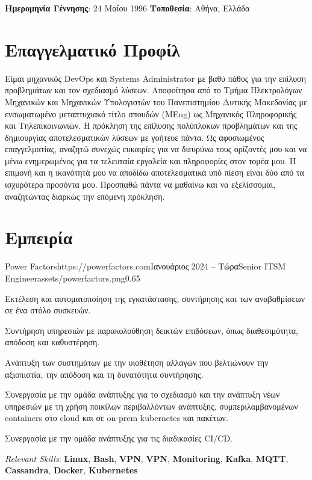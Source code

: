 \documentclass{mycv}
\begin{document}
	\pagestyle{empty}
	\begin{center}
		\textbf{Ημερομηνία Γέννησης}: 24 Μαΐου 1996 {\Large\textperiodcentered} \textbf{Τοποθεσία}: Αθήνα, Ελλάδα
	\end{center}

	\section{Επαγγελματικό Προφίλ}
	Είμαι μηχανικός DevOps και Systems Administrator με βαθύ πάθος για την επίλυση προβλημάτων και τον σχεδιασμό λύσεων. Αποφοίτησα από το Τμήμα Ηλεκτρολόγων Μηχανικών και Μηχανικών Υπολογιστών του Πανεπιστημίου Δυτικής Μακεδονίας με ενσωματωμένο μεταπτυχιακό τίτλο σπουδών (MEng) ως Μηχανικός Πληροφορικής και Τηλεπικοινωνιών. Η πρόκληση της επίλυσης πολύπλοκων προβλημάτων και της δημιουργίας αποτελεσματικών λύσεων με γοήτευε πάντα. Ως αφοσιωμένος επαγγελματίας, αναζητώ συνεχώς ευκαιρίες για να διευρύνω τους ορίζοντές μου και να μένω ενημερωμένος για τα τελευταία εργαλεία και πληροφορίες στον τομέα μου. Η επιμονή και η ικανότητά μου να αποδίδω αποτελεσματικά υπό πίεση είναι δύο από τα ισχυρότερα προσόντα μου. Προσπαθώ πάντα να μαθαίνω και να εξελίσσομαι, αναζητώντας διαρκώς την επόμενη πρόκληση.

	\section{Εμπειρία}

	\begin{EntryDatedLogo}{Power Factors}{https://powerfactors.com}{Ιανουάριος 2024 -- Τώρα}{Senior ITSM Engineer}{assets/powerfactors.png}{0.65}
		\begin{Itemize}
			\item Εκτέλεση και αυτοματοποίηση της εγκατάστασης, συντήρησης και των αναβαθμίσεων σε ένα στόλο συσκευών.
			\item Συντήρηση υπηρεσιών με παρακολούθηση δεικτών επιδόσεων, όπως διαθεσιμότητα, απόδοση και καθυστέρηση.
			\item Ανάπτυξη των συστημάτων με την υιοθέτηση αλλαγών που βελτιώνουν την αξιοπιστία, την απόδοση και τη δυνατότητα συντήρησης.
			\item Συνεργασία με την ομάδα ανάπτυξης για το σχεδιασμό και την ανάπτυξη νέων υπηρεσιών με τη χρήση ποικίλων περιβαλλόντων ανάπτυξης, συμπεριλαμβανομένων containers στο cloud και σε on-prem kubernetes και πακέτων.
			\item Συνεργασία με την ομάδα ανάπτυξης για τις διαδικασίες CI/CD.
			\item \textit{Relevant Skills}: \textbf{Linux}, \textbf{Bash}, \textbf{VPN}, \textbf{VPN}, \textbf{Monitoring}, \textbf{Kafka}, \textbf{MQTT}, \textbf{Cassandra}, \textbf{Docker}, \textbf{Kubernetes}
		\end{Itemize}
	\end{EntryDatedLogo}
	
\end{document}
